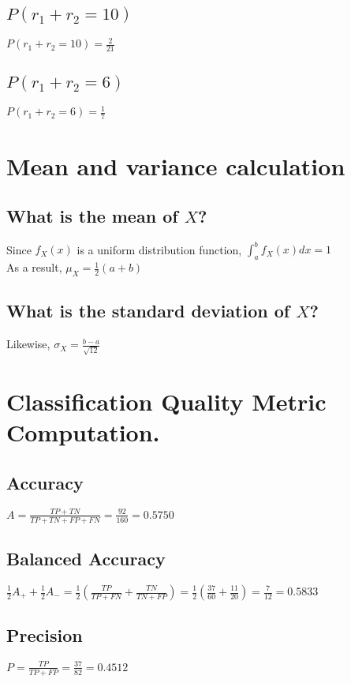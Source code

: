 \documentclass{article}
\begin{document}
\subsection{\texorpdfstring{$P\left(r_1+r_2=10\right)$}{P(r1+r2=10)}}
$\displaystyle P\left(r_1+r_2=10\right)=\frac{2}{21}$
\subsection{\texorpdfstring{$P\left(r_1+r_2=6\right)$}{P(r1+r2=6)}}
$\displaystyle P\left(r_1+r_2=6\right)=\frac{1}{7}$

\section{Mean and variance calculation}
\subsection{What is the mean of \texorpdfstring{$X$}{X}?}
Since $f_{X}(x)$ is a uniform distribution function, $\displaystyle\int_a^b f_{X}(x)dx=1$\\
As a result,
$\displaystyle\mu_{X}=\frac{1}{2}(a+b)$
\subsection{What is the standard deviation of \texorpdfstring{$X$}{X}?}
Likewise, $\displaystyle\sigma_{X}=\frac{b-a}{\sqrt{12}}$

\clearpage
\section{Classification Quality Metric Computation.}
\subsection{Accuracy}
$\displaystyle A=\frac{TP+TN}{TP+TN+FP+FN}=\frac{92}{160}=0.5750$

\subsection{Balanced Accuracy}
$\displaystyle\frac{1}{2}A_{+}+\frac{1}{2}A_{-}=\frac{1}{2}\left(\frac{TP}{TP+FN}+\frac{TN}{TN+FP}\right)=\frac{1}{2}\left(\frac{37}{60}+\frac{11}{20}\right)=\frac{7}{12}=0.5833$

\subsection{Precision}
$\displaystyle P=\frac{TP}{TP+FP}=\frac{37}{82}=0.4512$
\end{document}
